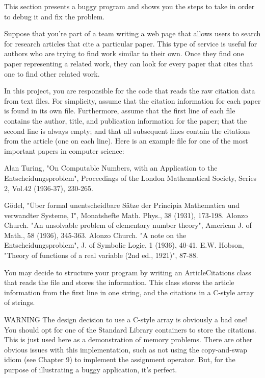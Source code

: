 
This section presents a buggy program and shows you the steps to take in order to debug it and fix the problem.

Suppose that you’re part of a team writing a web page that allows users to search for research articles that cite a particular paper. This type of service is useful for authors who are trying to find work similar to their own. Once they find one paper representing a related work, they can look for every paper that cites that one to find other related work.

In this project, you are responsible for the code that reads the raw citation data from text files. For simplicity, assume that the citation information for each paper is found in its own file. Furthermore, assume that the first line of each file contains the author, title, and publication information for the paper; that the second line is always empty; and that all subsequent lines contain the citations from the article (one on each line). Here is an example file for one of the most important papers in computer science:

\begin{shell}
Alan Turing, "On Computable Numbers, with an Application to the
Entscheidungsproblem", Proceedings of the London Mathematical Society, Series 2,
Vol.42 (1936-37), 230-265.

Gödel, "Über formal unentscheidbare Sätze der Principia Mathematica und verwandter
Systeme, I", Monatshefte Math. Phys., 38 (1931), 173-198.
Alonzo Church. "An unsolvable problem of elementary number theory", American J. of
Math., 58 (1936), 345-363.
Alonzo Church. "A note on the Entscheidungsproblem", J. of Symbolic Logic, 1
(1936), 40-41.
E.W. Hobson, "Theory of functions of a real variable (2nd ed., 1921)", 87-88.
\end{shell}


You may decide to structure your program by writing an ArticleCitations class that reads the file and stores the information. This class stores the article information from the first line in one string, and the citations in a C-style array of strings.

\begin{myWarning}{WARNING}
The design decision to use a C-style array is obviously a bad one! You should opt for one of the Standard Library containers to store the citations. This is just used here as a demonstration of memory problems. There are other obvious issues with this implementation, such as not using the copy-and-swap idiom (see Chapter 9) to implement the assignment operator. But, for the purpose of illustrating a buggy application, it’s perfect.
\end{myWarning}

